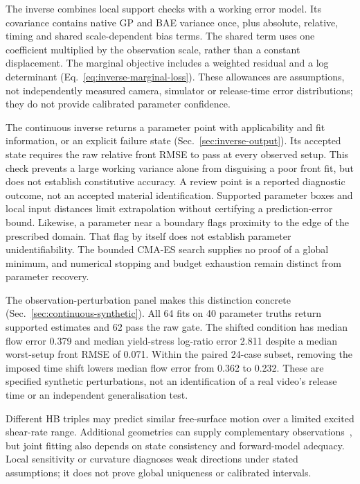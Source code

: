 The inverse combines local support checks with a working error
model. Its covariance contains native GP and BAE variance once,
plus absolute, relative, timing and shared scale-dependent bias terms.
The shared term uses one coefficient multiplied by the observation
scale, rather than a constant displacement. The marginal objective
includes a weighted residual and a log determinant
(Eq.~\eqref{eq:inverse-marginal-loss}). These allowances are assumptions,
not independently measured camera, simulator or release-time error
distributions; they do not provide calibrated parameter confidence.

The continuous inverse returns a parameter point with applicability
and fit information, or an explicit failure state
(Sec.~\ref{sec:inverse-output}). Its accepted state requires the raw
relative front RMSE to pass at every observed setup. This check prevents
a large working variance alone from disguising a poor front fit, but
does not establish constitutive accuracy. A review point is a reported
diagnostic outcome, not an accepted material identification. Supported
parameter boxes and local input distances limit extrapolation without
certifying a prediction-error bound. Likewise, a parameter near a
boundary flags proximity to the edge of the prescribed domain. That
flag by itself does not establish parameter unidentifiability. The bounded CMA-ES search supplies no
proof of a global minimum, and numerical stopping and budget exhaustion
remain distinct from parameter recovery.

The observation-perturbation panel makes this distinction concrete
(Sec.~\ref{sec:continuous-synthetic}). All 64 fits on 40 parameter
truths return supported estimates and 62 pass the raw gate.
The shifted condition has median flow error 0.379 and median
yield-stress log-ratio error 2.811 despite a median worst-setup
front RMSE of 0.071. Within the paired 24-case subset, removing the
imposed time shift lowers median flow error from 0.362 to 0.232.
These are specified synthetic perturbations, not an identification
of a real video's release time or an independent generalisation test.



Different HB triples may predict similar free-surface motion over
a limited excited shear-rate range. Additional geometries can supply
complementary observations~\cite{hamamichi2023nonnewtonian}, but joint
fitting also depends on state consistency and forward-model adequacy.
Local sensitivity or curvature diagnoses weak directions under stated
assumptions; it does not prove global uniqueness or calibrated intervals.

